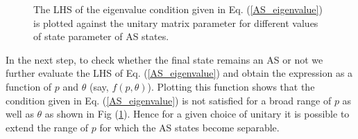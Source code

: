    \begin{figure}[htp]
    \caption{\footnotesize{The LHS of the eigenvalue condition given in Eq. (\ref{AS_eigenvalue}) is plotted against the unitary matrix parameter for different values of state parameter of AS states.}}
    \label{LHS_eval_cond_modW}
    \end{figure}
    
    In the next step, to check whether the final state remains an AS or not we further evaluate the LHS of Eq. (\ref{AS_eigenvalue}) and obtain the expression as a function of $p$ and $\theta$ (say, $f(p, \theta)$). Plotting this function shows that the condition given in Eq. (\ref{AS_eigenvalue}) is not satisfied for a broad range of $p$ as well as $\theta$ as shown in Fig (\ref{LHS_eval_cond_modW}). Hence for a given choice of unitary it is possible to extend the range of $p$ for which the AS states become separable.
  
